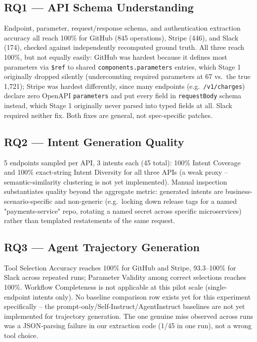 \documentclass[11pt]{article}
\begin{document}
\subsection{RQ1 --- API Schema Understanding}
Endpoint, parameter, request/response schema, and authentication extraction accuracy all reach
100\% for GitHub (845 operations), Stripe (446), and Slack (174), checked against independently
recomputed ground truth. All three reach 100\%, but not equally easily: GitHub was hardest because
it defines most parameters via \texttt{\$ref} to shared \texttt{components.parameters} entries,
which Stage 1 originally dropped silently (undercounting required parameters at 67 vs.\ the true
1{,}721); Stripe was hardest differently, since many endpoints (e.g.\ \texttt{/v1/charges})
declare zero OpenAPI \texttt{parameters} and put every field in \texttt{requestBody} schema
instead, which Stage 1 originally never parsed into typed fields at all. Slack required neither
fix. Both fixes are general, not spec-specific patches.

\subsection{RQ2 --- Intent Generation Quality}
5 endpoints sampled per API, 3 intents each (45 total): 100\% Intent Coverage and 100\%
exact-string Intent Diversity for all three APIs (a weak proxy -- semantic-similarity clustering
is not yet implemented). Manual inspection substantiates quality beyond the aggregate metric:
generated intents are business-scenario-specific and non-generic (e.g.\ locking down release tags
for a named "payments-service" repo, rotating a named secret across specific microservices) rather
than templated restatements of the same request.

\subsection{RQ3 --- Agent Trajectory Generation}
Tool Selection Accuracy reaches 100\% for GitHub and Stripe, 93.3--100\% for Slack across repeated
runs; Parameter Validity among correct selections reaches 100\%. Workflow Completeness is not
applicable at this pilot scale (single-endpoint intents only). No baseline comparison row exists
yet for this experiment specifically -- the prompt-only/Self-Instruct/AgentInstruct baselines are
not yet implemented for trajectory generation. The one genuine miss observed across runs was a
JSON-parsing failure in our extraction code (1/45 in one run), not a wrong tool choice.
\end{document}

